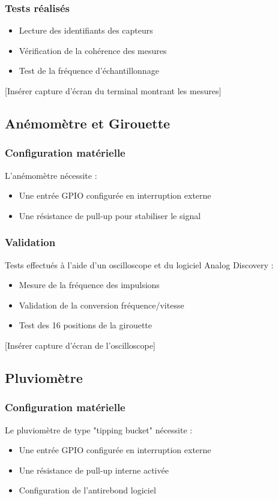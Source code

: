 \documentclass[12pt]{article}
\begin{document}
\subsubsection{Tests réalisés}
\begin{itemize}
    \item Lecture des identifiants des capteurs
    \item Vérification de la cohérence des mesures
    \item Test de la fréquence d'échantillonnage
\end{itemize}

[Insérer capture d'écran du terminal montrant les mesures]

\subsection{Anémomètre et Girouette}
\subsubsection{Configuration matérielle}
L'anémomètre nécessite :
\begin{itemize}
    \item Une entrée GPIO configurée en interruption externe
    \item Une résistance de pull-up pour stabiliser le signal
\end{itemize}

\subsubsection{Validation}
Tests effectués à l'aide d'un oscilloscope et du logiciel Analog Discovery :
\begin{itemize}
    \item Mesure de la fréquence des impulsions
    \item Validation de la conversion fréquence/vitesse
    \item Test des 16 positions de la girouette
\end{itemize}

[Insérer capture d'écran de l'oscilloscope]

\subsection{Pluviomètre}
\subsubsection{Configuration matérielle}
Le pluviomètre de type "tipping bucket" nécessite :
\begin{itemize}
    \item Une entrée GPIO configurée en interruption externe
    \item Une résistance de pull-up interne activée
    \item Configuration de l'antirebond logiciel
\end{itemize}
\end{document}
